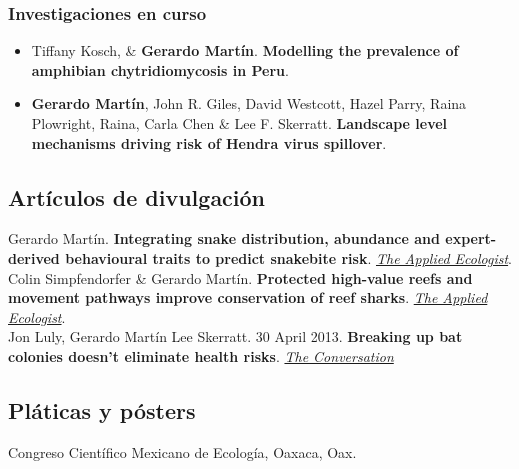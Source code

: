 \documentclass[11pt, letter]{article}
\newcommand{\years}[1]{\marginnote{\scriptsize #1}}
\begin{document}
\subsubsection*{Investigaciones en curso}

\begin{itemize}
	
	\item Tiffany Kosch, \& \textbf{Gerardo Mart\'in}. \textbf{Modelling the prevalence of amphibian chytridiomycosis in Peru}.\\
	
	\item \textbf{Gerardo Mart\'in}, John R. Giles, David Westcott, Hazel Parry, Raina Plowright, Raina, Carla Chen \& Lee F. Skerratt. \textbf{Landscape level mechanisms driving risk of Hendra virus spillover}.\\
\end{itemize}


\subsection*{Art\'iculos de divulgaci\'on}

\years{2021} Gerardo Mart\'in. \textbf{Integrating snake distribution, abundance and expert-derived behavioural traits to predict snakebite risk}. \href{https://appliedecologistsblog.com/2021/12/27/integrating-snake-distribution-abundance-and-expert-derived-behavioural-traits-to-predict-snakebite-risk/}{\emph{The Applied Ecologist}}.\\

\years{2020} Colin Simpfendorfer \& Gerardo Mart\'in. \textbf{Protected high-value reefs and movement pathways improve conservation of reef sharks}. \href{https://appliedecologistsblog.com/2020/07/30/protected-high-value-reefs-and-movement-pathways-improve-conservation-of-reef-sharks/}{\emph{The Applied Ecologist}}.\\

\years{2013} Jon Luly, Gerardo Mart\'in Lee Skerratt. 30 April 2013. \textbf{Breaking up bat colonies doesn't eliminate health risks}. \href{http://theconversation.com/breaking-up-bat-colonies-doesnt-eliminate-health-risks-13580}{\emph{The Conversation}}


\subsection*{Pl\'aticas y p\'osters}

\years{2022} Congreso Científico Mexicano de Ecología, Oaxaca, Oax.
\end{document}
